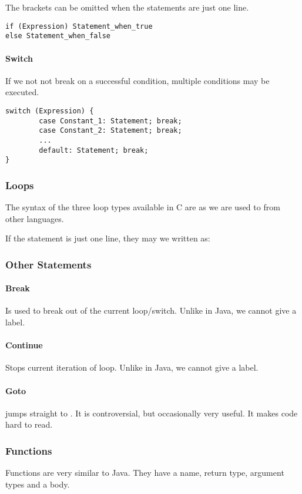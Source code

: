 The brackets can be omitted when the statements are just one line.
\begin{lstlisting}
if (Expression) Statement_when_true
else Statement_when_false
\end{lstlisting}

\paragraph{Switch}
If we not not break on a successful condition, multiple conditions may be executed.
\begin{lstlisting}
switch (Expression) {
        case Constant_1: Statement; break;
        case Constant_2: Statement; break;
        ...
        default: Statement; break;
}
\end{lstlisting}

\subsubsection{Loops}
The syntax of the three loop types available in C are as we are used to from other languages. 

If the statement is just one line, they may we written as:

\subsubsection{Other Statements}

\paragraph{Break}
Is used to break out of the current loop/switch. Unlike in Java, we cannot give a label.

\paragraph{Continue}
Stops current iteration of loop. Unlike in Java, we cannot give a label.

\paragraph{Goto}
 jumps straight to . It is controversial, but occasionally very useful. It makes code hard to read.

\subsubsection{Functions}
Functions are very similar to Java. They have a name, return type, argument types and a body.

